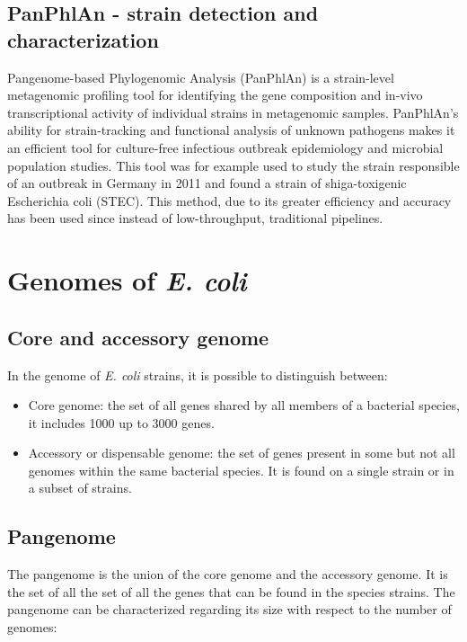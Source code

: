     \subsection{PanPhlAn - strain detection and characterization}
    Pangenome-based Phylogenomic Analysis (PanPhlAn) is a strain-level metagenomic profiling tool for identifying the gene composition and in-vivo transcriptional activity of individual strains in metagenomic samples.
    PanPhlAn’s ability for strain-tracking and functional analysis of unknown pathogens makes it an efficient tool for culture-free infectious outbreak epidemiology and microbial population studies.
    This tool was for example used to study the strain responsible of an outbreak in Germany in 2011 and found a strain of shiga-toxigenic Escherichia coli (STEC).
    This method, due to its greater efficiency and accuracy has been used since instead of low-throughput, traditional pipelines.

\section{Genomes of \emph{E. coli}}

    \subsection{Core and accessory genome}
    In the genome of \emph{E. coli} strains, it is possible to distinguish between:

    \begin{multicols}{2}
        \begin{itemize}
            \item Core genome: the set of all genes shared by all members of a bacterial species, it includes 1000 up to 3000 genes.
            \item Accessory or dispensable genome: the set of genes present in some but not all genomes within the same bacterial species.
                It is found on a single strain or in a subset of strains.
        \end{itemize}
    \end{multicols}

    \subsection{Pangenome}
    The pangenome is the union of the core genome and the accessory genome.
    It is the set of all the set of all the genes that can be found in the species strains.
    The pangenome can be characterized regarding its size with respect to the number of genomes:


